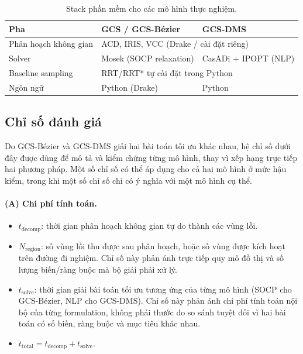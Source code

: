 \begin{table}[!htp]
    \centering
    \caption{Stack phần mềm cho các mô hình thực nghiệm.}
    \label{tab:software_stack}
    \begin{tabular}{lll}
        \toprule
        \textbf{Pha}          & \textbf{GCS / GCS-Bézier}                                  & \textbf{GCS-DMS}     \\
        \midrule
        Phân hoạch không gian & \multicolumn{2}{l}{ACD, IRIS, VCC (Drake / cài đặt riêng)}                        \\
        Solver                & Mosek (SOCP relaxation)                                    & CasADi + IPOPT (NLP) \\
        Baseline sampling     & \multicolumn{2}{l}{RRT/RRT* tự cài đặt trong Python}                              \\
        Ngôn ngữ              & Python (Drake)                                             & Python               \\
        \bottomrule
    \end{tabular}
\end{table}

\subsection{Chỉ số đánh giá}
\label{subsec:exp_metrics}

Do GCS-Bézier và GCS-DMS giải hai bài toán tối ưu khác nhau, hệ chỉ số dưới đây
được dùng để mô tả và kiểm chứng từng mô hình, thay vì xếp hạng trực tiếp hai
phương pháp. Một số chỉ số có thể áp dụng cho cả hai mô hình ở mức hậu kiểm,
trong khi một số chỉ số chỉ có ý nghĩa với một mô hình cụ thể.

\paragraph*{(A) Chi phí tính toán.}
\begin{itemize}
    \item $t_{\text{decomp}}$: thời gian phân hoạch không gian tự do thành các vùng lồi.
    \item $N_{\text{region}}$: số vùng lồi thu được sau phân hoạch, hoặc số vùng được kích hoạt trên đường đi nghiệm. Chỉ số này phản ánh trực tiếp quy mô đồ thị và số lượng biến/ràng buộc mà bộ giải phải xử lý.
    \item $t_{\text{solve}}$: thời gian giải bài toán tối ưu tương ứng của từng mô hình (SOCP cho GCS-Bézier, NLP cho GCS-DMS). Chỉ số này phản ánh chi phí tính toán nội bộ của từng formulation, không phải thước đo so sánh tuyệt đối vì hai bài toán có số biến, ràng buộc và mục tiêu khác nhau.
    \item $t_{\text{total}} = t_{\text{decomp}} + t_{\text{solve}}$.
\end{itemize}

